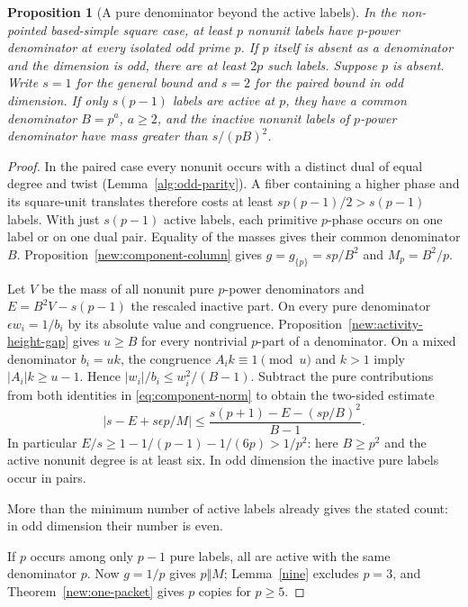 \documentclass[11pt]{amsart}
\numberwithin{equation}{section}
\newtheorem{proposition}[theorem]{Proposition}
\theoremstyle{definition}
\theoremstyle{plain}
\begin{document}
\begin{proposition}[A pure denominator beyond the active labels]\label{new:pure-extra}
In the non-pointed based-simple square case, at least $p$ nonunit
labels have $p$-power denominator at every isolated odd prime $p$.
If $p$ itself is absent as a denominator and the dimension is odd,
there are at least $2p$ such labels. Suppose $p$ is absent. Write $s=1$ for the general
bound and $s=2$ for the paired bound in odd dimension.
If only $s(p-1)$ labels are active at $p$, they have a common
denominator $B=p^a$, $a\ge2$, and the inactive nonunit labels of
$p$-power denominator have mass greater than $s/(pB)^2$.
\end{proposition}
\begin{proof}
In the paired case every nonunit occurs with a distinct dual of
equal degree and twist (Lemma~\ref{alg:odd-parity}). A fiber containing
a higher phase and its square-unit translates therefore costs at least
$sp(p-1)/2>s(p-1)$ labels. With just $s(p-1)$ active labels, each
primitive $p$-phase occurs on one label or on one dual pair. Equality
of the masses gives their common denominator $B$.
Proposition~\ref{new:component-column} gives $g=g_{\{p\}}=sp/B^2$
and $M_p=B^2/p$.

Let $V$ be the mass of all nonunit pure $p$-power denominators and $E=B^2 V-s(p-1)$ the rescaled inactive part. On every pure denominator $\epsilon w_i=1/b_i$ by its absolute value and congruence. Proposition~\ref{new:activity-height-gap} gives $u\ge B$ for every nontrivial $p$-part of a denominator. On a mixed denominator $b_i=u k$, the congruence $A_i k\equiv1\pmod u$ and $k>1$ imply $|A_i|k\ge u-1$. Hence $|w_i|/b_i\le w_i^2/(B-1)$. Subtract the pure contributions from both identities in \eqref{eq:component-norm} to obtain the two-sided estimate
\begin{equation}\label{eq:packet-shell}
 \left|s-E+s\epsilon p/M\right|
 \le \frac{s(p+1)-E-(sp/B)^2}{B-1}.
\end{equation}
In particular $E/s\ge1-1/(p-1)-1/(6p)>1/p^2$: here $B\ge p^2$ and the active nonunit degree is at least six. In odd dimension the inactive pure labels occur in pairs.

More than the minimum number of active labels already gives the stated
count: in odd dimension their number is even.

If $p$ occurs among only $p-1$ pure labels, all are active with the
same denominator $p$. Now $g=1/p$ gives $p\Vert M$; Lemma~\ref{nine}
excludes $p=3$, and Theorem~\ref{new:one-packet} gives $p$ copies for $p\ge5$.

\end{proof}
\end{document}

